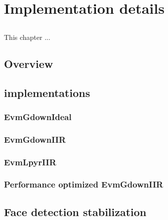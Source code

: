 \chapter{Implementation details} \label{chap:impl}

\section*{}


This chapter ...

\section{Overview} \label{sec:sol:overview}


\section{\evm{} implementations} \label{sec:impl:evm}



\subsection{EvmGdownIdeal} \label{sec:impl:evm:gdownideal}

\subsection{EvmGdownIIR} \label{sec:impl:evm:gdowniir}

\subsection{EvmLpyrIIR} \label{sec:impl:evm:lpyriir}

\subsection{Performance optimized EvmGdownIIR} \label{sec:impl:evm:final}

\section{Face detection stabilization} \label{sec:impl:face}

